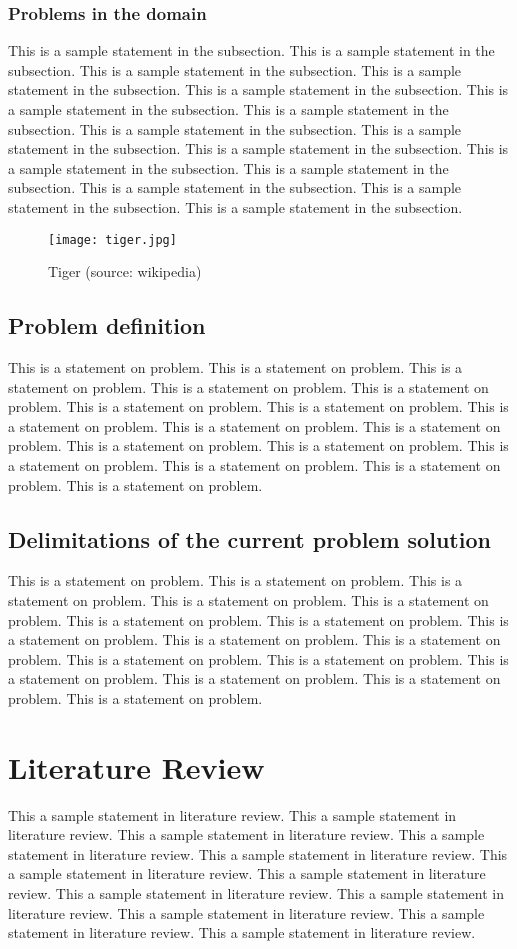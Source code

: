 \documentclass[12pt]{report}
\begin{document}
\subsection{Problems in the domain}
This is a sample statement in the subsection. This is a sample statement in the subsection. This is a sample statement in the subsection. This is a sample statement in the subsection. This is a sample statement in the subsection. This is a sample statement in the subsection. This is a sample statement in the subsection. This is a sample statement in the subsection. This is a sample statement in the subsection. This is a sample statement in the subsection. This is a sample statement in the subsection. This is a sample statement in the subsection. This is a sample statement in the subsection. This is a sample statement in the subsection. This is a sample statement in the subsection.
\begin{figure}[H]
\label{figTiger}
\texttt{[image: tiger.jpg]}
\centering
\caption{Tiger (source: wikipedia)}
\end{figure} 
\section{Problem definition}
This is a statement on problem. This is a statement on problem. This is a statement on problem. This is a statement on problem. This is a statement on problem. This is a statement on problem. This is a statement on problem. This is a statement on problem. This is a statement on problem. This is a statement on problem. This is a statement on problem. This is a statement on problem. This is a statement on problem. This is a statement on problem. This is a statement on problem. This is a statement on problem. 
\section{Delimitations of the current problem solution}
This is a statement on problem. This is a statement on problem. This is a statement on problem. This is a statement on problem. This is a statement on problem. This is a statement on problem. This is a statement on problem. This is a statement on problem. This is a statement on problem. This is a statement on problem. This is a statement on problem. This is a statement on problem. This is a statement on problem. This is a statement on problem. This is a statement on problem. This is a statement on problem. 

\chapter{Literature Review}
This a sample statement in literature review. This a sample statement in literature review. This a sample statement in literature review. This a sample statement in literature review. This a sample statement in literature review. This a sample statement in literature review. This a sample statement in literature review. This a sample statement in literature review. This a sample statement in literature review. This a sample statement in literature review. This a sample statement in literature review. This a sample statement in literature review. 
\end{document}
